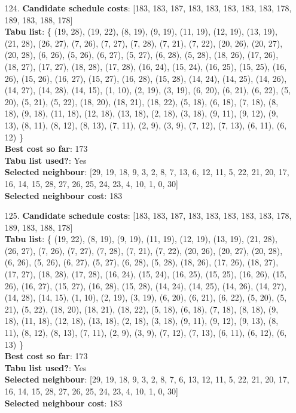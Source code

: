 \documentclass[fleqn]{article}
\begin{document}
\begin{itemize}
    \item[124.] \textbf{Candidate schedule costs}: [183, 183, 187, 183, 183, 183, 183, 183, 178, 189, 183, 188, 178] \\
    \textbf{Tabu list}: \{ (19, 28), (19, 22), (8, 19), (9, 19), (11, 19), (12, 19), (13, 19), (21, 28), (26, 27), (7, 26), (7, 27), (7, 28), (7, 21), (7, 22), (20, 26), (20, 27), (20, 28), (6, 26), (5, 26), (6, 27), (5, 27), (6, 28), (5, 28), (18, 26), (17, 26), (18, 27), (17, 27), (18, 28), (17, 28), (16, 24), (15, 24), (16, 25), (15, 25), (16, 26), (15, 26), (16, 27), (15, 27), (16, 28), (15, 28), (14, 24), (14, 25), (14, 26), (14, 27), (14, 28), (14, 15), (1, 10), (2, 19), (3, 19), (6, 20), (6, 21), (6, 22), (5, 20), (5, 21), (5, 22), (18, 20), (18, 21), (18, 22), (5, 18), (6, 18), (7, 18), (8, 18), (9, 18), (11, 18), (12, 18), (13, 18), (2, 18), (3, 18), (9, 11), (9, 12), (9, 13), (8, 11), (8, 12), (8, 13), (7, 11), (2, 9), (3, 9), (7, 12), (7, 13), (6, 11), (6, 12) \} \\
    \textbf{Best cost so far}: 173 \\
    \textbf{Tabu list used?}: Yes \\
    \textbf{Selected neighbour}: [29, 19, 18, 9, 3, 2, 8, 7, 13, 6, 12, 11, 5, 22, 21, 20, 17, 16, 14, 15, 28, 27, 26, 25, 24, 23, 4, 10, 1, 0, 30] \\
    \textbf{Selected neighbour cost}: 183
      

    \item[125.] \textbf{Candidate schedule costs}: [183, 183, 187, 183, 183, 183, 183, 183, 178, 189, 183, 188, 178] \\
    \textbf{Tabu list}: \{ (19, 22), (8, 19), (9, 19), (11, 19), (12, 19), (13, 19), (21, 28), (26, 27), (7, 26), (7, 27), (7, 28), (7, 21), (7, 22), (20, 26), (20, 27), (20, 28), (6, 26), (5, 26), (6, 27), (5, 27), (6, 28), (5, 28), (18, 26), (17, 26), (18, 27), (17, 27), (18, 28), (17, 28), (16, 24), (15, 24), (16, 25), (15, 25), (16, 26), (15, 26), (16, 27), (15, 27), (16, 28), (15, 28), (14, 24), (14, 25), (14, 26), (14, 27), (14, 28), (14, 15), (1, 10), (2, 19), (3, 19), (6, 20), (6, 21), (6, 22), (5, 20), (5, 21), (5, 22), (18, 20), (18, 21), (18, 22), (5, 18), (6, 18), (7, 18), (8, 18), (9, 18), (11, 18), (12, 18), (13, 18), (2, 18), (3, 18), (9, 11), (9, 12), (9, 13), (8, 11), (8, 12), (8, 13), (7, 11), (2, 9), (3, 9), (7, 12), (7, 13), (6, 11), (6, 12), (6, 13) \} \\
    \textbf{Best cost so far}: 173 \\
    \textbf{Tabu list used?}: Yes \\
    \textbf{Selected neighbour}: [29, 19, 18, 9, 3, 2, 8, 7, 6, 13, 12, 11, 5, 22, 21, 20, 17, 16, 14, 15, 28, 27, 26, 25, 24, 23, 4, 10, 1, 0, 30] \\
    \textbf{Selected neighbour cost}: 183
      


\end{itemize}
\end{document}
